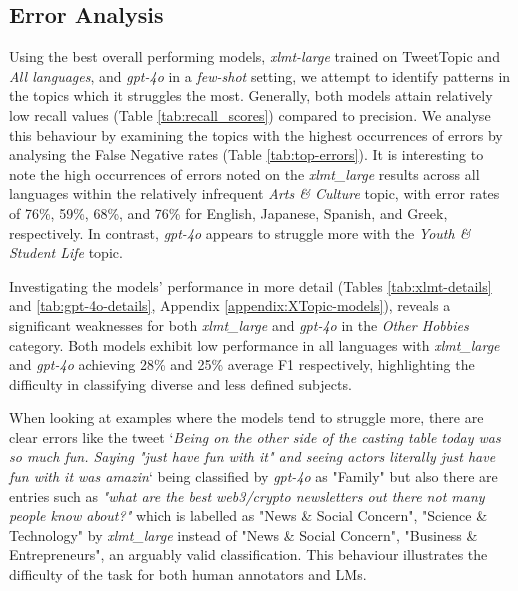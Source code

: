 \subsection{Error Analysis}
Using the best overall performing models, \textit{xlmt-large} trained on TweetTopic and \textit{All languages}, and \textit{gpt-4o} in a \textit{few-shot} setting, we attempt to identify patterns in the topics which it struggles the most. Generally, both models attain relatively low recall values (Table \ref{tab:recall_scores}) compared to precision. We analyse this behaviour by examining the topics with the highest occurrences of errors by analysing the False Negative rates (Table \ref{tab:top-errors}). It is interesting to note the high occurrences of errors noted on the \textit{xlmt\_large} results across all languages within the relatively infrequent \textit{Arts \& Culture} topic, with error rates of 76\%, 59\%, 68\%, and 76\% for English, Japanese, Spanish, and Greek, respectively. In contrast, \textit{gpt-4o} appears to struggle more with the \textit{Youth \& Student Life} topic.

Investigating the models' performance in more detail (Tables \ref{tab:xlmt-details} and \ref{tab:gpt-4o-details}, Appendix \ref{appendix:XTopic-models}), reveals a significant weaknesses for both \textit{xlmt\_large} and \textit{gpt-4o} in the \textit{Other Hobbies} category. Both models exhibit low performance in all languages with \textit{xlmt\_large}  and \textit{gpt-4o} achieving 28\% and 25\% average F1 respectively,  highlighting the difficulty in classifying diverse and less defined subjects. 


When looking at examples where the models tend to struggle more, there are clear errors like the tweet `\textit{Being on the other side of the casting table today was so much fun. Saying "just have fun with it" and seeing actors literally just have fun with it was amazin}` being classified by \textit{gpt-4o} as "Family" but also there are entries such as \textit{"what are the best web3/crypto newsletters out there not many people know about?"} which is labelled as "News \& Social Concern", "Science \& Technology" by \textit{xlmt\_large} instead of "News \& Social Concern", "Business \& Entrepreneurs", an arguably valid classification. This behaviour illustrates the difficulty of the task for both human annotators and \acp{LM}.





